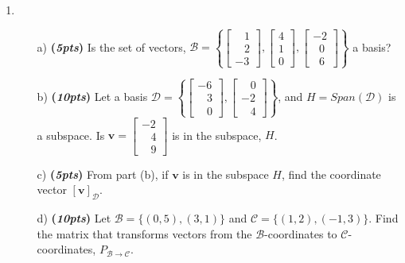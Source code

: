 \documentclass[12pt]{article}%
\begin{document}
\begin{enumerate}
    \item 
    \begin{itemize}
        \item[a)]\textbf{(\emph{5pts})} 
            Is the set of vectors, 
            \(
            \mathcal{B} = \left\{
            \begin{bmatrix} \;\;\;1\\\;\;\;2\\-3 \end{bmatrix},
            \begin{bmatrix} 4\\1\\0 \end{bmatrix},
            \begin{bmatrix} -2\\\;\;0\\\;\;6 \end{bmatrix}
            \right\}
            \)
            a basis?

        \vspace{9cm}
        
        \item[b)]\textbf{(\emph{10pts})} 
            Let a basis \(\mathcal{D}=\left\{\begin{bmatrix} -6\\\;\;\;3\\ \;\;\;0\end{bmatrix},
            \begin{bmatrix} \;\;\;0\\ -2\\ \;\;\;4\end{bmatrix}\right\}\), and 
            \(H=Span(\mathcal{D})\) is a subspace.
            Is \(\mathbf{v}=\begin{bmatrix} -2\\\;\;\;4\\\;\;\;9\end{bmatrix}\) is in the subspace, \(H\).

        \vspace{7cm}
        
        \item[c)]\textbf{(\emph{5pts})}  From part (b), if \(\mathbf{v}\) is in the subspace \(H\), find the coordinate vector \([\mathbf{v}]_{\mathcal{D}}\).

        \newpage

        \item[d)]\textbf{(\emph{10pts})} Let \( {\mathcal{B}} = \{ (0,5), (3,1) \} \) and \( {\mathcal{C}} = \{ (1,2), (-1,3) \} \).
        Find the matrix that transforms vectors from the \(\mathcal{B}\)-coordinates to  \(\mathcal{C}\)-coordinates, \( P_{{\mathcal{B}} \to {\mathcal{C}}} \).


\end{itemize}
\end{enumerate}
\end{document}
